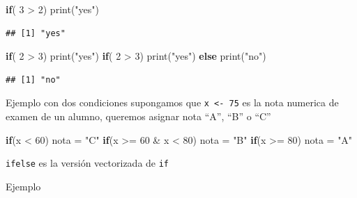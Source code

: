 \documentclass[
]{book}
\newenvironment{Shaded}{\begin{snugshade}}{\end{snugshade}}
\newcommand{\ControlFlowTok}[1]{\textcolor[rgb]{0.13,0.29,0.53}{\textbf{#1}}}
\newcommand{\DecValTok}[1]{\textcolor[rgb]{0.00,0.00,0.81}{#1}}
\newcommand{\FunctionTok}[1]{\textcolor[rgb]{0.00,0.00,0.00}{#1}}
\newcommand{\NormalTok}[1]{#1}
\newcommand{\OtherTok}[1]{\textcolor[rgb]{0.56,0.35,0.01}{#1}}
\newcommand{\SpecialCharTok}[1]{\textcolor[rgb]{0.00,0.00,0.00}{#1}}
\newcommand{\StringTok}[1]{\textcolor[rgb]{0.31,0.60,0.02}{#1}}
\begin{document}
\begin{Shaded}
\begin{Highlighting}[]
\ControlFlowTok{if}\NormalTok{( }\DecValTok{3} \SpecialCharTok{\textgreater{}} \DecValTok{2}\NormalTok{) }\FunctionTok{print}\NormalTok{(}\StringTok{"yes"}\NormalTok{)}
\end{Highlighting}
\end{Shaded}

\begin{verbatim}
## [1] "yes"
\end{verbatim}

\begin{Shaded}
\begin{Highlighting}[]
\ControlFlowTok{if}\NormalTok{( }\DecValTok{2} \SpecialCharTok{\textgreater{}} \DecValTok{3}\NormalTok{) }\FunctionTok{print}\NormalTok{(}\StringTok{"yes"}\NormalTok{)}
\ControlFlowTok{if}\NormalTok{( }\DecValTok{2} \SpecialCharTok{\textgreater{}} \DecValTok{3}\NormalTok{) }\FunctionTok{print}\NormalTok{(}\StringTok{"yes"}\NormalTok{) }\ControlFlowTok{else} \FunctionTok{print}\NormalTok{(}\StringTok{"no"}\NormalTok{)}
\end{Highlighting}
\end{Shaded}

\begin{verbatim}
## [1] "no"
\end{verbatim}

Ejemplo con dos condiciones
supongamos que \texttt{x\ \textless{}-\ 75} es la nota numerica de examen de un alumno, queremos asignar nota ``A'', ``B'' o ``C''

\begin{Shaded}
\begin{Highlighting}[]
\ControlFlowTok{if}\NormalTok{(x }\SpecialCharTok{\textless{}} \DecValTok{60}\NormalTok{) nota }\OtherTok{=} \StringTok{"C"}
\ControlFlowTok{if}\NormalTok{(x }\SpecialCharTok{\textgreater{}=} \DecValTok{60} \SpecialCharTok{\&}\NormalTok{ x }\SpecialCharTok{\textless{}} \DecValTok{80}\NormalTok{) nota }\OtherTok{=} \StringTok{"B"}
\ControlFlowTok{if}\NormalTok{(x }\SpecialCharTok{\textgreater{}=}  \DecValTok{80}\NormalTok{) nota }\OtherTok{=} \StringTok{"A"}
\end{Highlighting}
\end{Shaded}

\texttt{ifelse} es la versión vectorizada de \texttt{if}

Ejemplo
\end{document}
